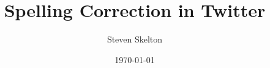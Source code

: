 \documentclass[parskip]{styles/cs4rep}
\begin{document}
  
  \title{Spelling Correction in Twitter}
  \author{Steven Skelton}
  \date{\today}

  
  \maketitle
  
  \tableofcontents

  
  
  
\end{document}
